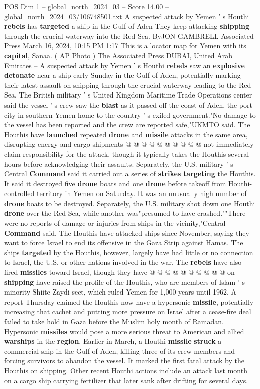 \begin{textsample}{POS Dim 1 – global\_north\_2024\_03 – Score 14.00 – global\_north\_2024\_03/106748501.txt}  \label{ex:f1_pos_390}
A suspected attack by Yemen ' s Houthi \textbf{rebels} has \textbf{targeted} a ship in the Gulf of Aden They keep attacking \textbf{shipping} through the crucial waterway into the Red Sea.
ByJON GAMBRELL Associated Press March 16, 2024, 10:15 PM 1:17 This is a locator map for Yemen with its \textbf{capital}, Sanaa. ( AP Photo ) The Associated Press DUBAI, United Arab Emirates -- A suspected attack by Yemen ' s Houthi \textbf{rebels} saw an \textbf{explosive} \textbf{detonate} near a ship early Sunday in the Gulf of Aden, potentially marking their latest assault on shipping through the crucial waterway leading to the Red Sea.
The British military ' s United Kingdom Maritime Trade Operations center said the vessel ' s crew saw the \textbf{blast} as it passed off the coast of Aden, the port city in southern Yemen home to the country ' s exiled government."No damage to the vessel has been reported and the crew are reported safe,"UKMTO said.
The Houthis have \textbf{launched} repeated \textbf{drone} and \textbf{missile} attacks in the same area, disrupting energy and cargo shipments @ @ @ @ @ @ @ @ @ @ not immediately claim responsibility for the attack, though it typically takes the Houthis several hours before acknowledging their assaults.
Separately, the U.S. military ' s Central \textbf{Command} said it carried out a series of \textbf{strikes} \textbf{targeting} the Houthis.
It said it destroyed five \textbf{drone} boats and one \textbf{drone} before takeoff from Houthi-controlled territory in Yemen on Saturday.
It was an unusually high number of \textbf{drone} boats to be destroyed.
Separately, the U.S. military shot down one Houthi \textbf{drone} over the Red Sea, while another was"presumed to have crashed.""There were no reports of damage or injuries from ships in the vicinity,"Central \textbf{Command} said.
The Houthis have attacked ships since November, saying they want to force Israel to end its offensive in the Gaza Strip against Hamas.
The ships \textbf{targeted} by the Houthis, however, largely have had little or no connection to Israel, the U.S. or other nations involved in the war.
The \textbf{rebels} have also fired \textbf{missiles} toward Israel, though they have @ @ @ @ @ @ @ @ @ @ on \textbf{shipping} have raised the profile of the Houthis, who are members of Islam ' s minority Shiite Zaydi sect, which ruled Yemen for 1,000 years until 1962.
A report Thursday claimed the Houthis now have a hypersonic \textbf{missile}, potentially increasing that cachet and putting more pressure on Israel after a cease-fire deal failed to take hold in Gaza before the Muslim holy month of Ramadan.
Hypersonic \textbf{missiles} would pose a more serious threat to American and allied \textbf{warships} in the \textbf{region}.
Earlier in March, a Houthi \textbf{missile} \textbf{struck} a commercial ship in the Gulf of Aden, killing three of its crew members and forcing survivors to abandon the vessel.
It marked the first fatal attack by the Houthis on shipping.
Other recent Houthi actions include an attack last month on a cargo ship carrying fertilizer that later sank after drifting for several days.


\end{textsample}

